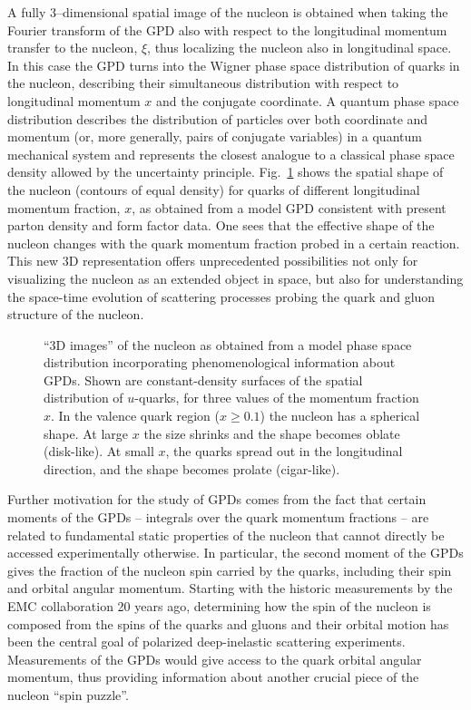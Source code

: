 A fully 3--dimensional spatial image of the nucleon is obtained when taking 
the Fourier transform of the GPD also with respect to the longitudinal 
momentum transfer to the nucleon, $\xi$, thus localizing the nucleon also in 
longitudinal space. In this case the GPD turns into the Wigner phase space 
distribution of quarks in the nucleon, describing their simultaneous 
distribution with respect to longitudinal momentum $x$ and the conjugate 
coordinate. A quantum phase space distribution describes the distribution
of particles over both coordinate and momentum (or, more generally,
pairs of conjugate variables) in a quantum mechanical system and
represents the closest analogue to a classical phase space density 
allowed by the uncertainty principle.  Fig.~\ref{fig:wigner} shows the 
spatial shape of the nucleon (contours of equal density) for quarks of 
different longitudinal momentum fraction, $x$, as obtained from a model GPD 
consistent with present parton density and form factor data. One sees 
that the effective shape of the nucleon changes with the quark 
momentum fraction probed in a certain reaction. This new 3D representation 
offers unprecedented possibilities not only for visualizing the nucleon as an 
extended object in space, but also for understanding the space-time evolution 
of scattering processes probing the quark and gluon structure of the nucleon.

\begin{figure}[t]
\vspace{5.0cm}
\caption{\small{``3D images'' of the nucleon as obtained from a model phase 
space distribution incorporating phenomenological information about GPDs.
Shown are constant-density surfaces of the spatial distribution of $u$-quarks, 
for three values of the momentum fraction $x$.  In the valence quark region 
($x \geq 0.1$) the nucleon has a spherical shape. At large $x$ the size 
shrinks and the shape becomes oblate (disk-like). At small $x$, the quarks 
spread out in the longitudinal direction, and the shape becomes prolate 
(cigar-like).}}
\label{fig:wigner}
\end{figure}

Further motivation for the study of GPDs comes from the fact that certain 
moments of the GPDs -- integrals over the quark momentum fractions -- are 
related to fundamental static properties of the nucleon that cannot directly 
be accessed experimentally otherwise.  In particular, the second moment of 
the GPDs gives the fraction of the nucleon spin carried by the quarks, 
including their spin and orbital angular momentum. Starting with the 
historic measurements by the EMC collaboration 20 years ago, determining 
how the spin of the nucleon is composed from the spins of the quarks and 
gluons and their orbital motion has been the central goal of polarized 
deep-inelastic scattering experiments.  Measurements of the GPDs would give 
access to the quark orbital angular momentum, thus providing information 
about another crucial piece of the nucleon ``spin puzzle''. 

